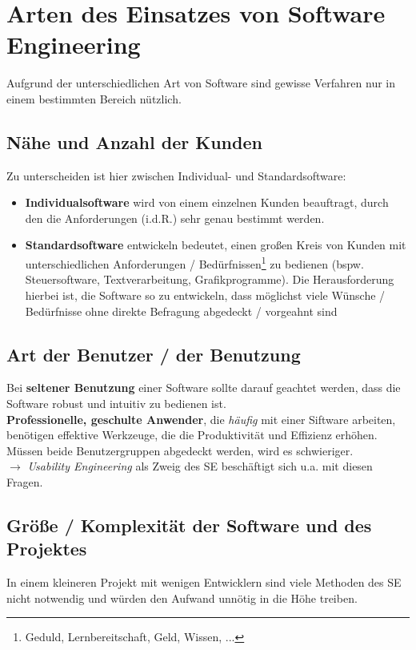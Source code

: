 \section{Arten des Einsatzes von Software Engineering}
Aufgrund der unterschiedlichen Art von Software sind gewisse Verfahren nur in einem bestimmten Bereich nützlich.

\subsection{Nähe und Anzahl der Kunden}
Zu unterscheiden ist hier zwischen Individual- und Standardsoftware:

\begin{itemize}
    \item \textbf{Individualsoftware} wird von einem einzelnen Kunden beauftragt, durch den die Anforderungen (i.d.R.) sehr genau bestimmt werden.
    \item \textbf{Standardsoftware} entwickeln bedeutet, einen großen Kreis von Kunden mit unterschiedlichen Anforderungen / Bedürfnissen\footnote{Geduld, Lernbereitschaft, Geld, Wissen, ...} zu bedienen (bspw. Steuersoftware, Textverarbeitung, Grafikprogramme).
    Die Herausforderung hierbei ist, die Software so zu entwickeln, dass möglichst viele Wünsche / Bedürfnisse ohne direkte Befragung abgedeckt / vorgeahnt sind
\end{itemize}

\subsection{Art der Benutzer / der Benutzung}
Bei \textbf{seltener Benutzung} einer Software sollte darauf geachtet werden, dass die Software robust und intuitiv zu bedienen ist.\\

\noindent
\textbf{Professionelle, geschulte Anwender}, die \textit{häufig} mit einer Siftware arbeiten, benötigen effektive Werkzeuge, die die Produktivität und Effizienz erhöhen.\\

\noindent
Müssen beide Benutzergruppen abgedeckt werden, wird es schwieriger.\\

\noindent
$\rightarrow$ \textit{Usability Engineering} als Zweig des SE beschäftigt sich u.a. mit diesen Fragen.

\subsection{Größe / Komplexität der Software und des Projektes}
In einem kleineren Projekt mit wenigen Entwicklern sind viele Methoden des SE nicht notwendig und würden den Aufwand unnötig in die Höhe treiben.\\

